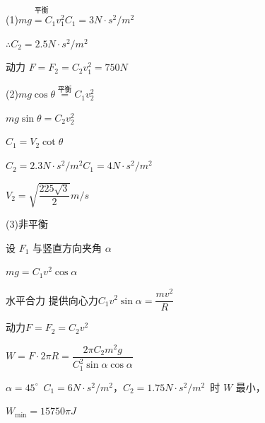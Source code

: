 \begin{problem}
\begin{solution}
(1)\quad $\overset{\text{平衡}}{mg=C_1v_1^2}$\quad $C_1=3\unit{N\cdot s^2/m^2}$
\par $\therefore C_2=2.5\unit{N\cdot s^2/m^2}$
\par 动力 $F=F_2=C_2v_1^2=750\unit{N}$
\par (2)\quad $mg\cos\theta\overset{\text{平衡}}{=}C_1v_2^2$
\par $mg\sin\theta=C_2v_2^2$
\par $C_1=V_2\cot\theta$ %
\par $C_2=2.3\unit{N\cdot s^2/m^2}$\quad $C_1=4\unit{N\cdot s^2/m^2}$
\par $V_2=\sqrt{\dfrac{225\sqrt{3}}{2}}\unit{m/s}$
\par (3)\quad 非平衡
\par 设 $F_1$ 与竖直方向夹角 $\alpha$
\par $mg=C_1v^2\cos\alpha$
\par 水平合力 提供向心力\quad $C_1v^2\sin\alpha=\dfrac{mv^2}{R}$
\par 动力\quad $F=F_2=C_2v^2$
\par $W=F\cdot 2\pi R=\dfrac{2\pi C_2m^2g}{C_1^2\sin\alpha\cos\alpha}$
\par $\alpha=45^\circ$\ $C_1=6\unit{N\cdot s^2/m^2}$，$C_2=1.75\unit{N\cdot s^2/m^2}$\ 时 $W$ 最小， %
\par $W_{\min}=15750\pi\unit{J}$
\end{solution}
\end{problem}
